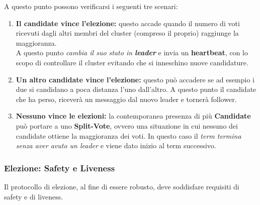 A questo punto possono verificarsi i seguenti tre scenari:
\begin{enumerate}
	\item{\textbf{Il candidate vince l'elezione:}} questo accade quando il numero di voti ricevuti dagli altri membri del cluster (compreso il proprio) raggiunge la maggioranza.\\
	A questo punto \textit{cambia il suo stato in \textbf{leader}} e invia un \textbf{heartbeat}, con lo scopo di controllare il cluster evitando che si inneschino nuove candidature.

	\item{\textbf{Un altro candidate vince l'elezione:}} questo può accadere se ad esempio i due si candidano a poca distanza l'uno dall'altro. A questo punto il candidate che ha perso, riceverà un messaggio dal nuovo leader e tornerà follower.
	
	\item{\textbf{Nessuno vince le elezioni:}} la contemporanea presenza di più \textbf{Candidate} può portare a uno \textbf{Split-Vote}, ovvero una situazione in cui nessuno dei candidate ottiene la maggioranza dei voti. In questo caso il \textit{term termina senza aver avuto un leader} e viene dato inizio al term successivo.
\end{enumerate}

  \subsubsection{Elezione: Safety e Liveness}\label{electionsaf}
  Il protocollo di elezione, al fine di essere robusto, deve soddisfare requisiti di safety e di liveness.
  
